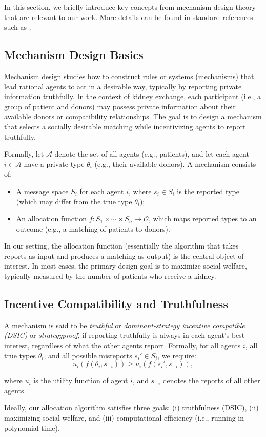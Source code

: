 In this section, we briefly introduce key concepts from mechanism design theory that are relevant to our work. More details can be found in standard references such as \cite{Roughgarden_2016}.





\subsection*{Mechanism Design Basics}

Mechanism design studies how to construct rules or systems (mechanisms) that lead rational agents to act in a desirable way, typically by reporting private information truthfully. In the context of kidney exchange, each participant (i.e., a group of patient and donors) may possess private information about their available donors or compatibility relationships. The goal is to design a mechanism that selects a socially desirable matching while incentivizing agents to report truthfully.

Formally, let $\mathcal{A}$ denote the set of all agents (e.g., patients), and let each agent $i \in \mathcal{A}$ have a private type $\theta_i$ (e.g., their available donors). A mechanism consists of:
\begin{itemize}
    \item A message space $S_i$ for each agent $i$, where $s_i \in S_i$ is the reported type (which may differ from the true type $\theta_i$);
    \item An allocation function $f : S_1 \times \cdots \times S_n \rightarrow \mathcal{O}$, which maps reported types to an outcome (e.g., a matching of patients to donors).
\end{itemize}

In our setting, the allocation function (essentially the algorithm that takes reports as input and produces a matching as output) is the central object of interest. In most cases, the primary design goal is to maximize social welfare, typically measured by the number of patients who receive a kidney.

\subsection*{Incentive Compatibility and Truthfulness}

A mechanism is said to be \textit{truthful}  or \textit{dominant-strategy incentive compatible (DSIC)} or \textit{strategyproof}, if reporting truthfully is always in each agent's best interest, regardless of what the other agents report. Formally, for all agents $i$, all true types $\theta_i$, and all possible misreports $s_i' \in S_i$, we require:
\[
u_i(f(\theta_i, s_{-i})) \geq u_i(f(s_i', s_{-i})),
\]

where $u_i$ is the utility function of agent $i$, and $s_{-i}$ denotes the reports of all other agents.

Ideally, our allocation algorithm satisfies three goals: (i) truthfulness (DSIC), (ii) maximizing social welfare, and (iii) computational efficiency (i.e., running in polynomial time).



